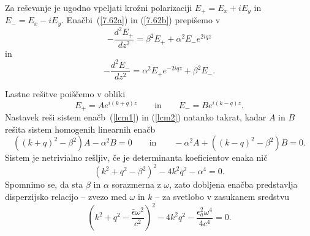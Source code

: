 Za reševanje je ugodno vpeljati krožni polarizaciji 
$E_{+}=E_{x}+iE_{y}$ in $E_{-}=E_{x}-iE_{y}$.
Enačbi~(\ref{7.62a}) in (\ref{7.62b}) prepišemo v
\begin{equation}
-\frac{d^{2}E_{+}}{dz^{2}}=\beta^{2}E_{+}+\alpha^{2}E_{-}e^{2iqz}
\label{lcm1}
\end{equation}
in 
\begin{equation}
-\frac{d^{2}E_{-}}{dz^{2}}=\alpha^{2}E_{+}e^{-2iqz}+\beta^{2}E_{-}.
\label{lcm2}
\end{equation}

Lastne rešitve poiščemo v obliki 
\begin{equation}
E_{+}  =  Ae^{i(k+q)z} 
\qquad
\mathrm{in}
\qquad
E_{-}  =  Be^{i(k-q)z}.
\label{7.65}
\end{equation}
Nastavek reši sistem enačb~(\ref{lcm1}) in (\ref{lcm2}) 
natanko takrat, kadar $A$ in $B$ rešita sistem homogenih linearnih enačb 
\begin{equation}
\left((k+q)^{2}-\beta^{2}\right)A-\alpha^{2}B  =  0 \qquad \mathrm{in} \qquad 
-\alpha^{2}A+\left((k-q)^{2}-\beta^{2}\right)B  =  0.
\label{7.66d}
\end{equation}
 Sistem je netrivialno rešljiv, če je determinanta koeficientov enaka
nič
\begin{equation}
\left(k^{2}+q^{2}-\beta^{2}\right)^{2}-4k^{2}q^{2}-\alpha^{4}=0.
\label{7.66}
\end{equation}
Spomnimo se, da sta $\beta$ in $\alpha$ sorazmerna z $\omega$,
zato dobljena enačba predstavlja disperzijsko relacijo -- zvezo med 
$\omega$ in $k$ -- za svetlobo v zasukanem sredstvu
\begin{equation}
\left(k^{2}+q^{2}-\frac{\bar{\epsilon}\omega^{2}}{c^{2}}\right)^{2}-
4k^{2}q^{2}- \frac{\epsilon_{a}^2\omega^{4}}{4c^{4}}
=0.
\label{7.66a}
\end{equation}


